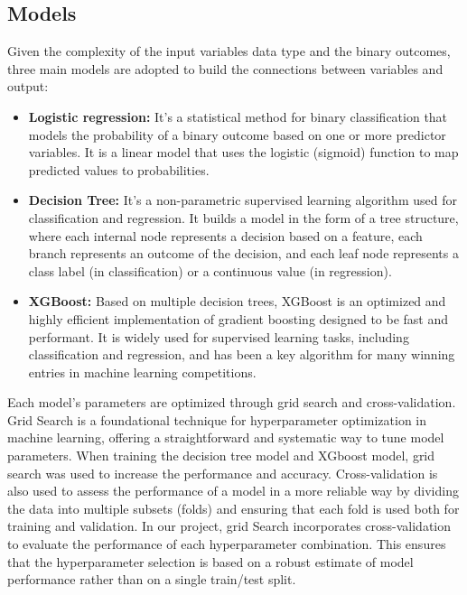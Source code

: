 \documentclass[conference]{IEEEtran}
\begin{document}
\subsection{Models}
Given the complexity of the input variables data type and the binary outcomes, three main models are adopted to build the connections between variables and output:
\begin{itemize}
    \item \textbf{Logistic regression:} It's a statistical method for binary classification that models the probability of a binary outcome based on one or more predictor variables. It is a linear model that uses the logistic (sigmoid) function to map predicted values to probabilities.
    \item \textbf{Decision Tree:} It's a non-parametric supervised learning algorithm used for classification and regression. It builds a model in the form of a tree structure, where each internal node represents a decision based on a feature, each branch represents an outcome of the decision, and each leaf node represents a class label (in classification) or a continuous value (in regression).
    \item \textbf{XGBoost:} Based on multiple decision trees, XGBoost is an optimized and highly efficient implementation of gradient boosting designed to be fast and performant. It is widely used for supervised learning tasks, including classification and regression, and has been a key algorithm for many winning entries in machine learning competitions.
\end{itemize}

Each model's parameters are optimized through grid search and cross-validation. Grid Search is a foundational technique for hyperparameter optimization in machine learning, offering a straightforward and systematic way to tune model parameters. When training the decision tree model and XGboost model, grid search was used to increase the performance and accuracy. Cross-validation is also used to assess the performance of a model in a more reliable way by dividing the data into multiple subsets (folds) and ensuring that each fold is used both for training and validation. In our project, grid Search incorporates cross-validation to evaluate the performance of each hyperparameter combination. This ensures that the hyperparameter selection is based on a robust estimate of model performance rather than on a single train/test split.
\end{document}
